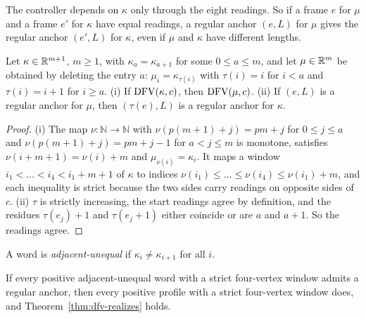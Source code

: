 The controller depends on $\kappa$ only through the eight readings. So if
a frame $e$ for $\mu$ and a frame $e'$ for $\kappa$ have equal readings, a
regular anchor $(e,L)$ for $\mu$ gives the regular anchor $(e',L)$ for
$\kappa$, even if $\mu$ and $\kappa$ have different lengths.

\begin{lemma}\label{lem:constant-run}
Let $\kappa\in\mathbb{R}^{m+1}$, $m\ge1$, with $\kappa_a=\kappa_{a+1}$ for some
$0\le a\le m$, and let $\mu\in\mathbb{R}^m$ be obtained by deleting the entry $a$:
$\mu_i=\kappa_{\tau(i)}$ with $\tau(i)=i$ for $i<a$ and $\tau(i)=i+1$ for
$i\ge a$.
\textup{(i)} If $\operatorname{DFV}(\kappa,c)$, then $\operatorname{DFV}(\mu,c)$.
\textup{(ii)} If $(e,L)$ is a regular anchor for $\mu$, then $(\tau(e),L)$ is
a regular anchor for $\kappa$.
\end{lemma}

\begin{proof}
(i) The map $\nu\colon\mathbb N\to\mathbb N$ with $\nu(p(m+1)+j)=pm+j$ for
$0\le j\le a$ and $\nu(p(m+1)+j)=pm+j-1$ for $a<j\le m$ is monotone, satisfies
$\nu(i+m+1)=\nu(i)+m$ and $\mu_{\nu(i)}=\kappa_i$. It maps a window
$i_1<\dots<i_4<i_1+m+1$ of $\kappa$ to indices
$\nu(i_1)\le\dots\le\nu(i_4)\le\nu(i_1)+m$, and each inequality is strict
because the two sides carry readings on opposite sides of $c$.
(ii) $\tau$ is strictly increasing, the start readings agree by definition,
and the residues $\tau(e_j)+1$ and $\tau(e_j+1)$ either coincide or are $a$
and $a+1$. So the readings agree.
\end{proof}

A word is \emph{adjacent-unequal} if $\kappa_i\ne\kappa_{i+1}$ for all $i$.

\begin{proposition}\label{prop:reduction}
If every positive adjacent-unequal word with a strict four-vertex window
admits a regular anchor, then every positive profile with a strict four-vertex
window does, and Theorem~\ref{thm:dfv-realizes} holds.
\end{proposition}

